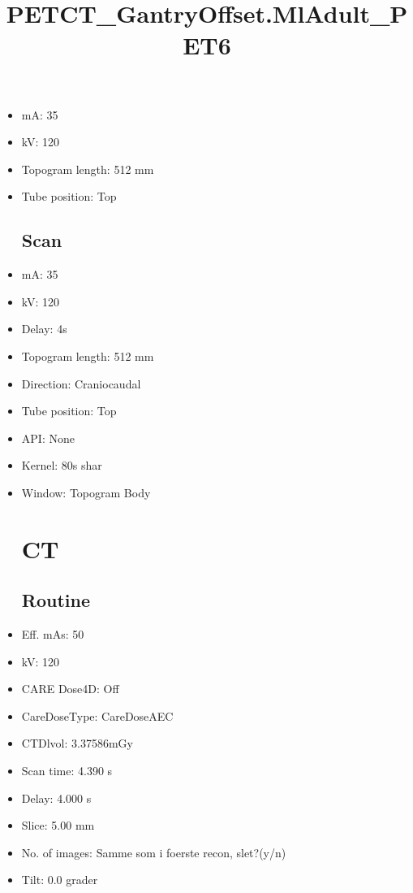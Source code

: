 \documentclass[12pt]{article}
\title{PETCT\_GantryOffset.MlAdult\_PET6}
\begin{document}
\maketitle
\newpage
\tableofcontents
\newpage
{}


\begin{itemize}\section{Topogram}
\subsection{Routine}
\item mA: 35\item kV: 120\item Topogram length: 512 mm\item Tube position: Top
\subsection{Scan}\item mA: 35\item kV: 120\item Delay: 4s\item Topogram length: 512 mm\item Direction: Craniocaudal\item Tube position: Top\item API: None\item Kernel: 80s shar\item Window: Topogram Body
\section{CT}
\subsection{Routine}
\item Eff. mAs: 50\item kV: 120\item CARE Dose4D: Off\item CareDoseType: CareDoseAEC\item CTDlvol: 3.37586mGy\item Scan time: 4.390 s\item Delay: 4.000 s\item Slice: 5.00 mm\item No. of images: Samme som i foerste recon, slet?(y/n)\item Tilt: 0.0 grader

\end{itemize}
\end{document}

